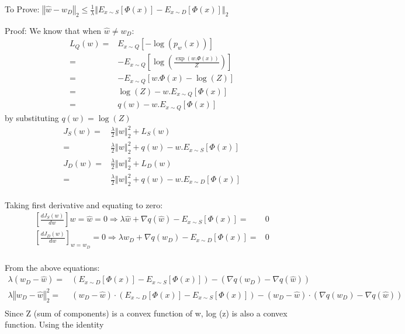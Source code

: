 \documentclass{article}
\begin{document}
\begin{description}
  \item{To Prove:} $\left\Vert \hat{w}-w_{D}\right\Vert _{2}\leq\frac{1}{\lambda}\left\Vert E_{x\sim S}\left[\Phi\left(x\right)\right]-E_{x\sim D}\left[\Phi\left(x\right)\right]\right\Vert _{2}$
  \item{Proof:}
    We know that when $ \hat{w}\neq w_{D} $:
    \begin{align*}
      L_{Q}(w)= & E_{x\sim Q}\left[-\log\left(p_{w}\left(x\right)\right)\right] \\
      = & -E_{x\sim Q}\left[\log\left(\frac{\exp\left(w.\Phi\left(x\right)\right)}{Z}\right)\right] \\
      = &-E_{x\sim Q}\left[w.\Phi\left(x\right)-\log\left(Z\right)\right] \\
      = & \log\left(Z\right)-w.E_{x\sim Q}\left[\Phi\left(x\right)\right] \\
      = & q\left(w\right)-w.E_{x\sim Q}\left[\Phi\left(x\right)\right]
    \end{align*}
    by substituting $ q(w)=\log(Z)$
    \begin{align*}
      J_{S}(w) = & \frac{\lambda}{2}\left\Vert w\right\Vert _{2}^{2}+L_{S}(w) \\
      = & \frac{\lambda}{2}\left\Vert w\right\Vert _{2}^{2}+q\left(w\right)-w.E_{x\sim S}\left[\Phi\left(x\right)\right] \\
      J_{D}(w)= & \frac{\lambda}{2}\left\Vert w\right\Vert _{2}^{2}+L_{D}(w) \\
      = & \frac{\lambda}{2}\left\Vert w\right\Vert _{2}^{2}+q\left(w\right)-w.E_{x\sim D}\left[\Phi\left(x\right)\right] \\
    \end{align*}

    Taking first derivative and equating to zero:
    \begin{align*}
      {\left[\frac{dJ_{S}(w)}{dw}\right]} {w=\hat{w}}=0\Rightarrow\lambda\hat{w}+\nabla q(\hat{w})-E_{x\sim S}\left[\Phi\left(x\right)\right] = & 0 \\
      {\left[\frac{dJ_{D}(w)}{dw}\right]}_{w=w_{D}}=0\Rightarrow\lambda w_{D}+\nabla q(w_{D})-E_{x\sim D}\left[\Phi\left(x\right)\right]= & 0 \\
    \end{align*}

    From the above equations:
    \begin{align*}
      \lambda\left(w_{D}-\hat{w}\right) = & \left(E_{x\sim D}\left[\Phi\left(x\right)\right]-E_{x\sim S}\left[\Phi\left(x\right)\right]\right)-\left(\nabla q(w_{D})-\nabla q(\hat{w})\right) \\
      \lambda\left\Vert w_{D}-\hat{w}\right\Vert _{2}^{2}= &\left(w_{D}-\hat{w}\right)\cdot\left(E_{x\sim D}\left[\Phi\left(x\right)\right]-E_{x\sim S}\left[\Phi\left(x\right)\right]\right)-\left(w_{D}-\hat{w}\right)\cdot\left(\nabla q(w_{D})-\nabla q(\hat{w})\right) \\
    \end{align*}
    Since Z (sum of components) is a convex function of w, log (z) is also a convex function. Using the identity


\end{description}
\end{document}
